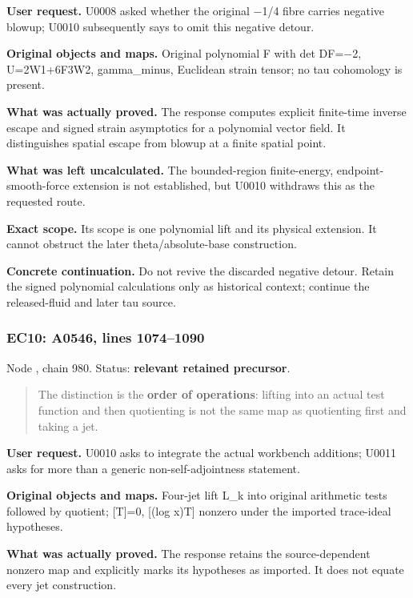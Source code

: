 \textbf{User request.} U0008 asked whether the original
\allowbreak{}\ensuremath{−}\allowbreak{}1/4 fibre carries negative
blowup; U0010 subsequently says to omit this negative detour.

\textbf{Original objects and maps.} Original polynomial F with det
DF=\allowbreak{}\ensuremath{−}\allowbreak{}2, U=2W1+6F3W2, gamma\_minus,
Euclidean strain tensor; no tau cohomology is present.

\textbf{What was actually proved.} The response computes explicit
finite-time inverse escape and signed strain asymptotics for a
polynomial vector field. It distinguishes spatial escape from blowup at
a finite spatial point.

\textbf{What was left uncalculated.} The bounded-region finite-energy,
endpoint-smooth-force extension is not established, but U0010 withdraws
this as the requested route.

\textbf{Exact scope.} Its scope is one polynomial lift and its physical
extension. It cannot obstruct the later theta/absolute-base
construction.

\textbf{Concrete continuation.} Do not revive the discarded negative
detour. Retain the signed polynomial calculations only as historical
context; continue the released-fluid and later tau source.

\subsubsection{EC10: A0546, lines
1074--1090}\label{TranscriptLedgerStage:ec10-a0546-lines-10741090}

Node \protect{}, chain 980.
Status: \textbf{relevant retained precursor}.

\begin{quote}
The distinction is the \textbf{order of operations}: lifting into an
actual test function and then quotienting is not the same map as
quotienting first and taking a jet.
\end{quote}

\textbf{User request.} U0010 asks to integrate the actual workbench
additions; U0011 asks for more than a generic non-self-adjointness
statement.

\textbf{Original objects and maps.} Four-jet lift L\_k into original
arithmetic tests followed by quotient; {[}T{]}=0, {[}(log x)T{]} nonzero
under the imported trace-ideal hypotheses.

\textbf{What was actually proved.} The response retains the
source-dependent nonzero map and explicitly marks its hypotheses as
imported. It does not equate every jet construction.

